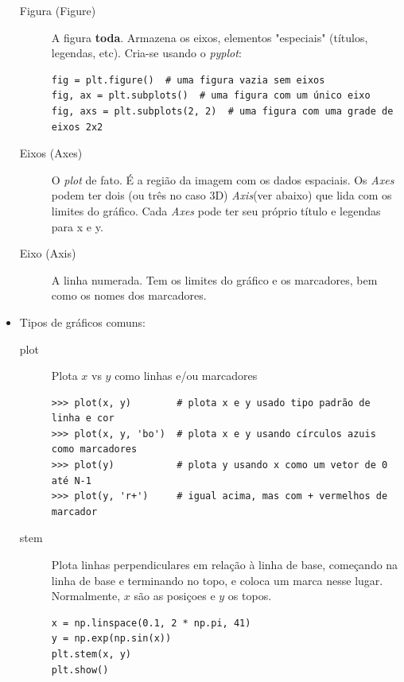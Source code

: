 \begin{itemize}
	\begin{description}
		\item[Figura (Figure)] A figura \textbf{toda}. Armazena os eixos, elementos "especiais" (títulos, legendas, etc). Cria-se usando o \textit{pyplot}:
		\begin{verbatim}
fig = plt.figure()  # uma figura vazia sem eixos
fig, ax = plt.subplots()  # uma figura com um único eixo
fig, axs = plt.subplots(2, 2)  # uma figura com uma grade de eixos 2x2
		\end{verbatim}
		\item[Eixos (Axes)] O \textit{plot} de fato. É a região da imagem com os dados espaciais. Os \textit{Axes} podem ter dois (ou três no caso 3D) \textit{Axis}(ver abaixo) que lida com os limites do gráfico. Cada \textit{Axes} pode ter seu próprio título e legendas para x e y.
		\item[Eixo (Axis)] A linha numerada. Tem os limites do gráfico e os marcadores, bem como os nomes dos marcadores.
	\end{description}
	\item Tipos de gráficos comuns:
	\begin{description}
		\item[plot] Plota $x$ vs $y$ como linhas e/ou marcadores
		\begin{verbatim}
>>> plot(x, y)        # plota x e y usado tipo padrão de linha e cor
>>> plot(x, y, 'bo')  # plota x e y usando círculos azuis como marcadores
>>> plot(y)           # plota y usando x como um vetor de 0 até N-1
>>> plot(y, 'r+')     # igual acima, mas com + vermelhos de marcador
		\end{verbatim}
		\item[stem] Plota linhas perpendiculares em relação à linha de base, começando na linha de base e terminando no topo, e coloca um marca nesse lugar. Normalmente, $x$ são as posiçoes e $y$ os topos.
		\begin{verbatim}
x = np.linspace(0.1, 2 * np.pi, 41)
y = np.exp(np.sin(x))
plt.stem(x, y)
plt.show()
		\end{verbatim}
		

\end{description}
\end{itemize}
